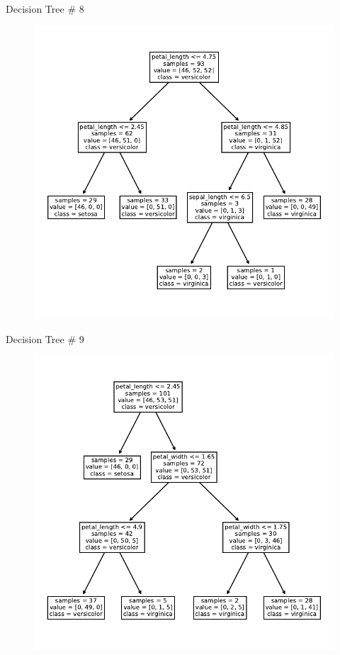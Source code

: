 \documentclass{beamer}
\begin{document}
\begin{frame}{Decision Tree \# 8}
  \begin{figure}
    \includegraphics[scale=0.7]{tree-8.pdf}
  \end{figure}
\end{frame}


\begin{frame}{Decision Tree \# 9}
  \begin{figure}
    \includegraphics[scale=0.7]{tree-9.pdf}
  \end{figure}
\end{frame}
\end{document}
